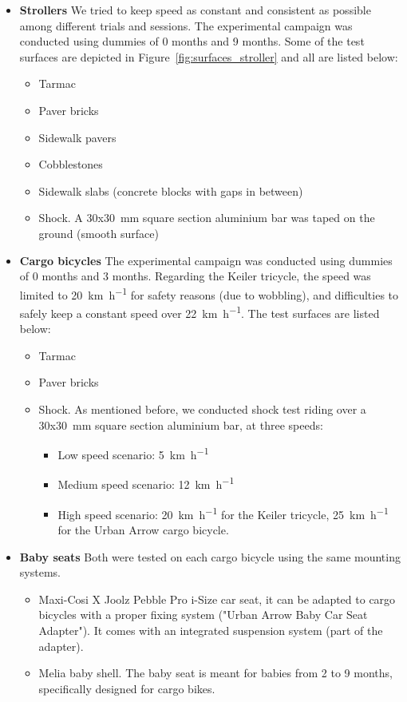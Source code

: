 \documentclass[a4paper]{article}
\begin{document}
\begin{itemize}
  \item \textbf{Strollers} We tried to keep speed as constant and consistent as
  possible among different trials and sessions. The experimental campaign was
  conducted using dummies of 0 months and 9 months. Some of the test surfaces
  are depicted in Figure~\ref{fig:surfaces_stroller} and all are listed below:
  \begin{itemize}
      \item Tarmac
      \item Paver bricks %
      \item Sidewalk pavers %
      \item Cobblestones 
      \item Sidewalk slabs (concrete blocks with gaps in between) %
      \item Shock. A 30x30~\si{\mm} square section aluminium bar was taped on the ground (smooth surface)
  \end{itemize}
  \item \textbf{Cargo bicycles} The experimental campaign was conducted using
  dummies of 0 months and 3 months. Regarding the Keiler tricycle, the speed was
  limited to 20~\si{\km\per\hour} for safety reasons (due to wobbling), and
  difficulties to safely keep a constant speed over 22~\si{\km\per\hour}. The test surfaces are listed below:
  \begin{itemize}
      \item Tarmac
      \item Paver bricks
      \item Shock. As mentioned before, we conducted shock test riding over a
      30x30~\si{\mm} square section aluminium bar, at three speeds: 
      \begin{itemize}
          \item Low speed scenario: 5~\si{\km\per\hour}
          \item Medium speed scenario: 12~\si{\km\per\hour}
          \item High speed scenario: 20~\si{\km\per\hour} for the Keiler
          tricycle, 25~\si{\km\per\hour} for the Urban Arrow cargo bicycle.
      \end{itemize}
  \end{itemize}
  \item \textbf{Baby seats} Both were tested on each cargo bicycle using the
  same mounting systems.
  \begin{itemize}
      \item Maxi-Cosi X Joolz Pebble Pro i-Size car seat, it can be adapted to
      cargo bicycles with a proper fixing system ("Urban Arrow Baby Car Seat
      Adapter"). It comes with an integrated suspension system (part of the
      adapter). 
      \item Melia baby shell. The baby seat is meant for babies from 2 to 9
      months, specifically designed for cargo bikes.
  \end{itemize}
\end{itemize}
\end{document}
